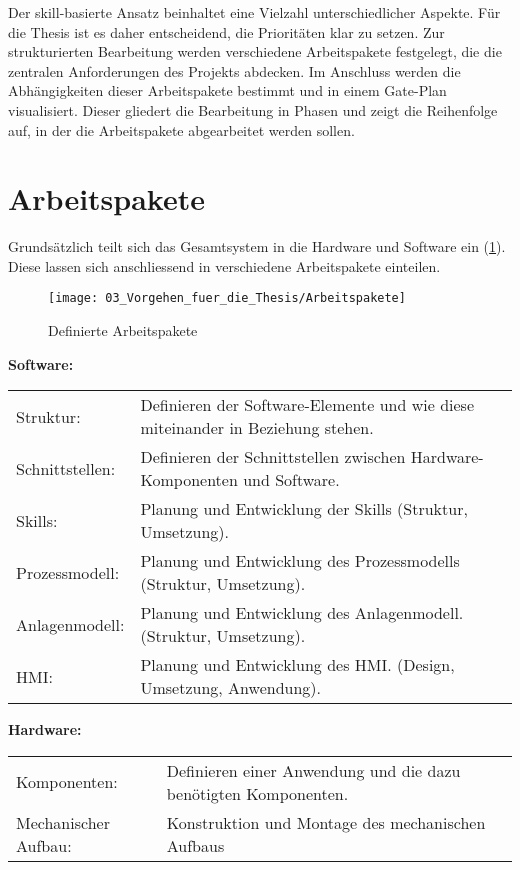 Der skill-basierte Ansatz beinhaltet eine Vielzahl unterschiedlicher Aspekte. Für die Thesis ist es daher entscheidend, die Prioritäten klar zu setzen. Zur strukturierten Bearbeitung werden verschiedene Arbeitspakete festgelegt, die die zentralen Anforderungen des Projekts abdecken. Im Anschluss werden die Abhängigkeiten dieser Arbeitspakete bestimmt und in einem Gate-Plan visualisiert. Dieser gliedert die Bearbeitung in Phasen und zeigt die Reihenfolge auf, in der die Arbeitspakete abgearbeitet werden sollen.


\section{Arbeitspakete} \label{Arbeitspakete}

	Grundsätzlich teilt sich das Gesamtsystem in die Hardware und Software ein (\ref{fig:Arbeitspakete}). Diese lassen sich anschliessend in verschiedene Arbeitspakete einteilen. 

	\begin{figure}[h!]
		\centering
		\texttt{[image: 03\_Vorgehen\_fuer\_die\_Thesis/Arbeitspakete]}
		\captionsetup{justification=centering}
		\caption{Definierte Arbeitspakete}
		\label{fig:Arbeitspakete}
	\end{figure}
	
	\textbf{Software:} \vspace{2mm} 
	\\
	\begin{tabularx}{\textwidth}{@{}>{}p{10em} X@{}}
		Struktur: & 
		Definieren der Software-Elemente und wie diese miteinander in Beziehung stehen. 
		\\
		
		Schnittstellen: & 
		Definieren der Schnittstellen zwischen Hardware-Komponenten und Software. 
		\\
		
		Skills: & 
		Planung und Entwicklung der Skills (Struktur, Umsetzung).
		\\
		
		Prozessmodell: & 
		Planung und Entwicklung des Prozessmodells (Struktur, Umsetzung).
		\\
		
		Anlagenmodell: & 
		Planung und Entwicklung des Anlagenmodell. (Struktur, Umsetzung).
		\\
		
		HMI: & 
		Planung und Entwicklung des HMI. (Design, Umsetzung, Anwendung).
		\\
	\end{tabularx}
	
	\textbf{Hardware:} \vspace{2mm} 
	\\
	\begin{tabularx}{\textwidth}{@{}>{}p{10em} X@{}}
		Komponenten: & 
		Definieren einer Anwendung und die dazu benötigten Komponenten.
		\\
		
		Mechanischer Aufbau: & 
		Konstruktion und Montage des mechanischen Aufbaus
		\\
	\end{tabularx}
	
	\newpage

